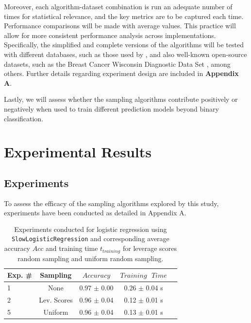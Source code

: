 \documentclass{article}
\theoremstyle{plain}
\theoremstyle{definition}
\theoremstyle{remark}
\begin{document}
Moreover, each algorithm-dataset combination is run an adequate number of times for statistical relevance, and the key metrics are to be captured each time. Performance comparisons will be made with average values. This practice will allow for more consistent performance analysis across implementations. Specifically, the simplified and complete versions of the algorithms will be tested with different databases, such as those used by \citeauthor{chow24}, and also well-known open-source datasets, such as the Breast Cancer Wisconsin Diagnostic Data Set \cite{breastcancer}, among others. Further details regarding experiment design are included in \textbf{Appendix A}.

Lastly, we will assess whether the sampling algorithms contribute positively or negatively when used to train different prediction models beyond binary classification.


\section{Experimental Results}

\subsection{Experiments}

To assess the efficacy of the sampling algorithms explored by this study, experiments have been conducted as detailed in Appendix A.

\begin{table}[t]
	\caption{Experiments conducted for logistic regression using \texttt{SlowLogisticRegression} and corresponding average accuracy $Acc$ and training time $t_{training}$ for leverage scores random sampling and uniform random sampling.}
	\label{t1}
	\vskip 0.15in
	\begin{center}
		\begin{small}
			\begin{sc}
				\begin{tabular}{lcccr}
					\toprule
					Exp. \# & Sampling & $Accuracy$ & $Training \text{ } Time$\\
					\midrule
					1 & None & 0.97 $\pm$ 0.00 & 0.26 $\pm$ 0.04 s \\
					2 & Lev. Scores & 0.96 $\pm$ 0.04 & 0.12 $\pm$ 0.01 s \\
					5 & Uniform & 0.96 $\pm$ 0.04 & 0.13 $\pm$ 0.01 s \\
					\bottomrule
				\end{tabular}
			\end{sc}
		\end{small}
	\end{center}
	\vskip -0.1in
\end{table}
\end{document}

